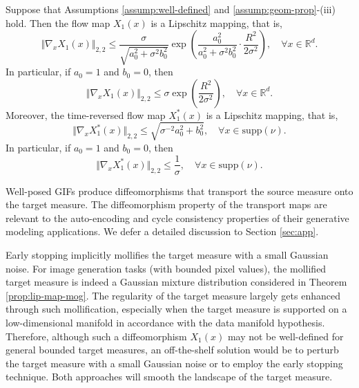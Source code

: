 \documentclass[twoside,11pt]{article}
\def\sR{{\mathbb{R}}}
\numberwithin{equation}{section}
\begin{document}
\begin{proposition} \label{prop:lip-map-mog}
Suppose that Assumptions \ref{assump:well-defined} and \ref{assump:geom-prop}-(iii) hold.
Then the flow map $X_1(x)$ is a Lipschitz mapping, that is,
\begin{equation*}
    \Vert \nabla_x X_1(x) \Vert_{2,2} \leq \frac{\sigma}{\sqrt{a_0^2 + \sigma^2 b_0^2}} \exp \left( \frac{a_0^2}{a_0^2 + \sigma^2 b_0^2} \cdot \frac{R^2}{2 \sigma^2} \right), \quad \forall x \in \sR^d.
\end{equation*}
In particular, if $a_0 = 1$ and $b_0 = 0$, then
\begin{equation*}
    \Vert \nabla_x X_1(x) \Vert_{2,2} \leq \sigma \exp \left( \frac{R^2}{2 \sigma^2} \right), \quad \forall x \in \sR^d.
\end{equation*}
Moreover, the time-reversed flow map $X^{*}_1(x)$ is a Lipschitz mapping, that is,
\begin{equation*}
    \Vert \nabla_x X^{*}_1(x) \Vert_{2,2} \le \sqrt{\sigma^{-2} a_0^2 + b_0^2}, \quad \forall x \in \mathrm{supp}(\nu).
\end{equation*}
In particular, if $a_0 = 1$ and $b_0 = 0$, then
\begin{equation*}
    \Vert \nabla_x X^{*}_1(x) \Vert_{2,2} \le \frac{1}{\sigma}, \quad \forall x \in \mathrm{supp}(\nu).
\end{equation*}
\end{proposition}

\begin{remark}
    Well-posed GIFs produce diffeomorphisms that transport the source measure onto the target measure. The diffeomorphism property of the transport maps are relevant to the
    auto-encoding and cycle consistency properties of their generative modeling applications. We defer a detailed discussion to Section \ref{sec:app}.
\end{remark}

    Early stopping implicitly mollifies the target measure with a small Gaussian noise. For image generation tasks (with bounded pixel values), the mollified target measure is indeed a Gaussian mixture distribution considered in Theorem \ref{prop:lip-map-mog}. The regularity of the target measure largely gets enhanced through such mollification, especially when the target measure is supported on a low-dimensional manifold in accordance with the data manifold hypothesis. Therefore, although such a diffeomorphism $X_1(x)$ may not be well-defined for general bounded target measures, an off-the-shelf solution would be to perturb the target measure with a small Gaussian noise or to employ the early stopping technique. Both approaches will smooth the landscape of the target measure.
\end{document}
